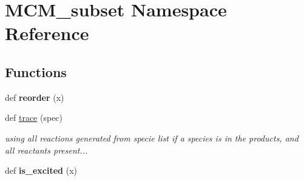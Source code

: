 \hypertarget{namespaceMCM__subset}{}\section{M\+C\+M\+\_\+subset Namespace Reference}
\label{namespaceMCM__subset}
\subsection*{Functions}
\begin{DoxyCompactItemize}
\item 
\mbox{\label{namespaceMCM__subset_a415b347a64e3092f8a3bf6e322ddba18}} 
def {\bfseries reorder} (x)
\item 
def \mbox{\hyperlink{namespaceMCM__subset_a4b3a88b2d7b093981b698e0227194e3f}{trace}} (spec)
\begin{DoxyCompactList}\small\item\em using all reactions generated from specie list if a species is in the products, and all reactants present... \end{DoxyCompactList}\item 
\mbox{\label{namespaceMCM__subset_ab3d8a7784d36f47ac51ea065839bca41}} 
def {\bfseries is\+\_\+excited} (x)
\end{DoxyCompactItemize}
